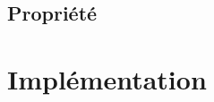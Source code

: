 \documentclass[a4paper,11pt]{article}
\begin{document}
\begin{Form}
\subsection{Propriété}
\section{Implémentation}
\end{Form}
\end{document}

